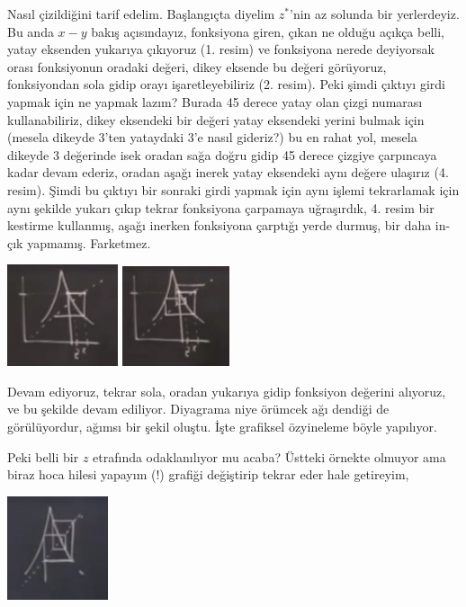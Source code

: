 \documentclass[12pt,fleqn]{article}\usepackage{../../common}
\begin{document}
Nasıl çizildiğini tarif edelim. Başlangıçta diyelim $z^\ast$'nin az solunda
bir yerlerdeyiz. Bu anda $x-y$ bakış açısındayız, fonksiyona giren, çıkan
ne olduğu açıkça belli, yatay eksenden yukarıya çıkıyoruz (1. resim) ve
fonksiyona nerede deyiyorsak orası fonksiyonun oradaki değeri, dikey
eksende bu değeri görüyoruz, fonksiyondan sola gidip orayı
işaretleyebiliriz (2. resim). Peki şimdi çıktıyı girdi yapmak için ne
yapmak lazım? Burada 45 derece yatay olan çizgi numarası kullanabiliriz,
dikey eksendeki bir değeri yatay eksendeki yerini bulmak için (mesela
dikeyde 3'ten yataydaki 3'e nasıl gideriz?) bu en rahat yol, mesela dikeyde
3 değerinde isek oradan sağa doğru gidip 45 derece çizgiye çarpıncaya kadar
devam ederiz, oradan aşağı inerek yatay eksendeki aynı değere ulaşırız
(4. resim). Şimdi bu çıktıyı bir sonraki girdi yapmak için aynı işlemi
tekrarlamak için aynı şekilde yukarı çıkıp tekrar fonksiyona çarpamaya
uğraşırdık, 4. resim bir kestirme kullanmış, aşağı inerken fonksiyona
çarptığı yerde durmuş, bir daha in-çık yapmamış. Farketmez.

\includegraphics[width=8.8em]{18_16.png}
\includegraphics[width=8.5em]{18_18.png}

Devam ediyoruz, tekrar sola, oradan yukarıya gidip fonksiyon değerini
alıyoruz, ve bu şekilde devam ediliyor. Diyagrama niye örümcek ağı dendiği
de görülüyordur, ağımsı bir şekil oluştu. İşte grafiksel özyineleme böyle
yapılıyor.

Peki belli bir $z$ etrafında odaklanılıyor mu acaba? Üstteki örnekte
olmuyor ama biraz hoca hilesi yapayım (!) grafiği değiştirip tekrar eder
hale getireyim, 

\includegraphics[width=8em]{18_13.png}
\end{document}
